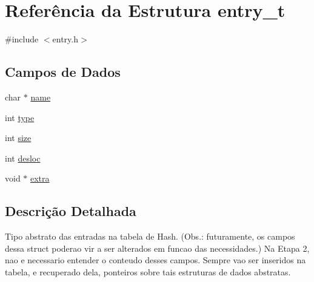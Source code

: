 \hypertarget{structentry__t}{
\section{Referência da Estrutura entry\_\-t}
\label{structentry__t}
}


{\ttfamily \#include $<$entry.h$>$}\subsection*{Campos de Dados}
\begin{DoxyCompactItemize}
\item 
char $\ast$ \hyperlink{structentry__t_ab04f7c44381c01e411be318875eb5eb6}{name}
\item 
int \hyperlink{structentry__t_af284680fed934779f16fc2b6a42101b1}{type}
\item 
int \hyperlink{structentry__t_a67460ae77b6a4433d48f7736ee6a500a}{size}
\item 
int \hyperlink{structentry__t_abc62dec01315bbb72bff20ce69d8ef37}{desloc}
\item 
void $\ast$ \hyperlink{structentry__t_a6f7a7b18bd57fafba8d1f2d257ac3863}{extra}
\end{DoxyCompactItemize}


\subsection{Descrição Detalhada}
Tipo abstrato das entradas na tabela de Hash. (Obs.: futuramente, os campos dessa struct poderao vir a ser alterados em funcao das necessidades.) Na Etapa 2, nao e necessario entender o conteudo desses campos. Sempre vao ser inseridos na tabela, e recuperado dela, ponteiros sobre tais estruturas de dados abstratas. 

